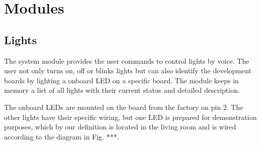 \chapter{Modules} \label{chap:modules}






\section{Lights}

The system module provides the user commands to control lights by voice. The user not only turns on, off or blinks lights but can also identify the development boards by lighting a onboard LED on a specific board. The module keeps in memory a list of all lights with their current status and detailed description.

The onboard LEDs are mounted on the board from the factory on pin 2. The other lights have their specific wiring, but one LED is prepared for demonstration purposes, which by our definition is located in the living room and is wired according to the diagram in Fig. ***. 



